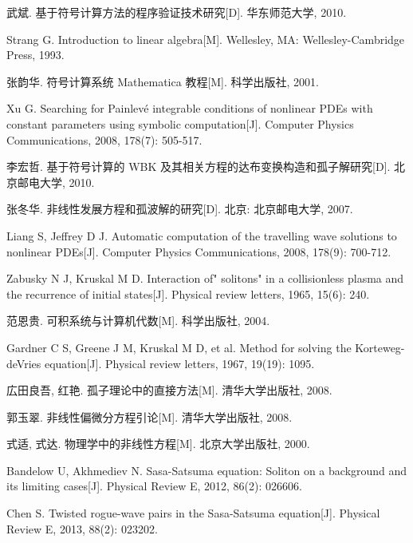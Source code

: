 \cleardoublepage
{}
{}
\nocite{*}
%

\begin{thebibliography}{0}

武斌. 基于符号计算方法的程序验证技术研究[D]. 华东师范大学, 2010.

Strang G. Introduction to linear algebra[M]. Wellesley, MA: Wellesley-Cambridge Press, 1993.

张韵华. 符号计算系统 Mathematica 教程[M]. 科学出版社, 2001.

Xu G. Searching for Painlevé integrable conditions of nonlinear PDEs with constant parameters using symbolic computation[J]. Computer Physics Communications, 2008, 178(7): 505-517.

李宏哲. 基于符号计算的 WBK 及其相关方程的达布变换构造和孤子解研究[D]. 北京邮电大学, 2010.

张冬华. 非线性发展方程和孤波解的研究[D]. 北京: 北京邮电大学, 2007.

Liang S, Jeffrey D J. Automatic computation of the travelling wave solutions to nonlinear PDEs[J]. Computer Physics Communications, 2008, 178(9): 700-712.

Zabusky N J, Kruskal M D. Interaction of" solitons" in a collisionless plasma and the recurrence of initial states[J]. Physical review letters, 1965, 15(6): 240.

范恩贵. 可积系统与计算机代数[M]. 科学出版社, 2004.

Gardner C S, Greene J M, Kruskal M D, et al. Method for solving the Korteweg-deVries equation[J]. Physical review letters, 1967, 19(19): 1095.

広田良吾, 红艳. 孤子理论中的直接方法[M]. 清华大学出版社, 2008.

郭玉翠. 非线性偏微分方程引论[M]. 清华大学出版社, 2008.

式适, 式达. 物理学中的非线性方程[M]. 北京大学出版社, 2000.

Bandelow U, Akhmediev N. Sasa-Satsuma equation: Soliton on a background and its limiting cases[J]. Physical Review E, 2012, 86(2): 026606.

Chen S. Twisted rogue-wave pairs in the Sasa-Satsuma equation[J]. Physical Review E, 2013, 88(2): 023202.


\end{thebibliography}
